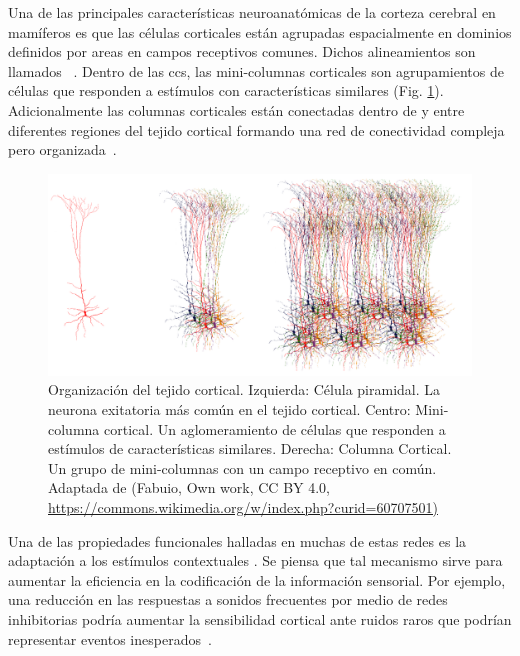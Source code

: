 {Una de las principales características neuroanatómicas de la corteza cerebral en mamíferos es que las células corticales están agrupadas espacialmente en dominios definidos por areas en campos receptivos comunes. Dichos alineamientos son llamados ~\cite{mountcastle_1955, mountcastle_1957, hubel_1962, hubel_1968}. Dentro de las \glspl{cc}, las mini-columnas corticales son agrupamientos de células que responden a estímulos con características similares (Fig. \ref{fig:Biological}). Adicionalmente las columnas corticales están conectadas dentro de y entre diferentes regiones del tejido cortical formando una red de conectividad compleja pero organizada~\cite{mountcastle_1997}.

\begin{figure}[h!]
    \centering
    \includegraphics[width=1.0\textwidth]{Biological.png}
    \caption{Organización del tejido cortical. Izquierda: Célula piramidal. La neurona exitatoria más común en el tejido cortical.
	    Centro: Mini-columna cortical. Un aglomeramiento de células que responden a estímulos de características similares.
	    Derecha: Columna Cortical. Un grupo de mini-columnas con un campo receptivo en común.
	    Adaptada de (Fabuio, Own work, CC BY 4.0, \url{https://commons.wikimedia.org/w/index.php?curid=60707501)}}
    \label{fig:Biological}
\end{figure}

Una de las propiedades funcionales halladas en muchas de estas redes es la adaptación a los estímulos contextuales \cite{KRAUSE201436,doi:10.1167/16.13.1}. Se piensa que tal mecanismo sirve para aumentar la eficiencia en la codificación de la información sensorial. Por ejemplo, una reducción en las respuestas a sonidos frecuentes por medio de redes inhibitorias podría aumentar la sensibilidad cortical ante ruidos raros que podrían representar eventos inesperados~\cite{Natan2015ComplementaryCO,nachum_2003,Javitt11962}.

}

